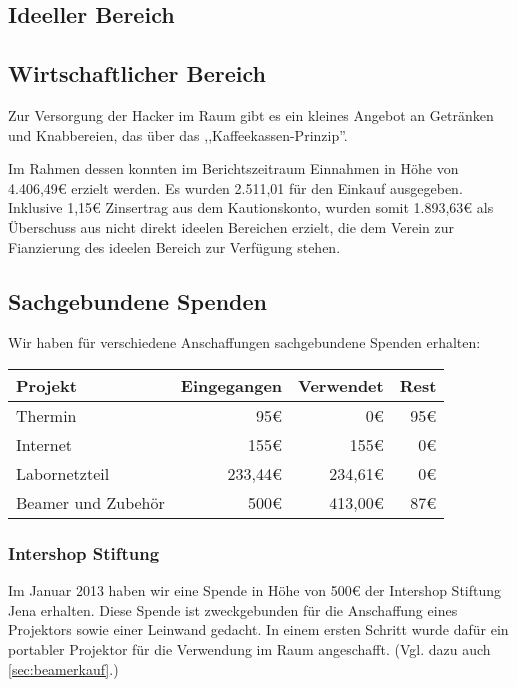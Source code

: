 \documentclass[10pt,DIV16]{scrartcl}
\begin{document}
\subsection{Ideeller Bereich}
\label{sec:ideeller_bereich}


\subsection{Wirtschaftlicher Bereich}
\label{sec:wirschaftlicher_bereich}

Zur Versorgung der Hacker im Raum gibt es ein kleines Angebot an
Getränken und Knabbereien, das über das ,,Kaffeekassen-Prinzip''. 

Im Rahmen dessen konnten im Berichtszeitraum Einnahmen in Höhe von 
4.406,49\euro{} erzielt werden. Es wurden 2.511,01 für den Einkauf 
ausgegeben. Inklusive 1,15\euro{} Zinsertrag aus dem Kautionskonto, 
wurden somit 1.893,63\euro{} als Überschuss aus nicht direkt ideelen 
Bereichen erzielt, die dem Verein zur Fianzierung des ideelen Bereich 
zur Verfügung stehen.

\subsection{Sachgebundene Spenden}
Wir haben für verschiedene Anschaffungen sachgebundene Spenden erhalten:

\begin{table}[h]
	\begin{tabular}{l|r|r|r}
	\textbf{Projekt} & \textbf{Eingegangen} & \textbf{Verwendet} & \textbf{Rest} \\ \hline
	Thermin & 95\euro & 0\euro & 95\euro \\
	Internet & 155\euro & 155\euro & 0\euro \\
	Labornetzteil & 233,44\euro & 234,61\euro & 0\euro{} \\
	Beamer und Zubehör & 500\euro & 413,00\euro & 87\euro \\
	\end{tabular}
\end{table}


\subsubsection{Intershop Stiftung}
\label{sec:iss-spende}
Im Januar 2013 haben wir eine Spende in Höhe von 500\euro{} der Intershop
Stiftung Jena erhalten. Diese Spende ist zweckgebunden für die
Anschaffung eines Projektors sowie einer Leinwand gedacht. In einem
ersten Schritt wurde dafür ein portabler Projektor für die Verwendung
im Raum angeschafft. (Vgl. dazu auch \ref{sec:beamerkauf}.)
\end{document}
